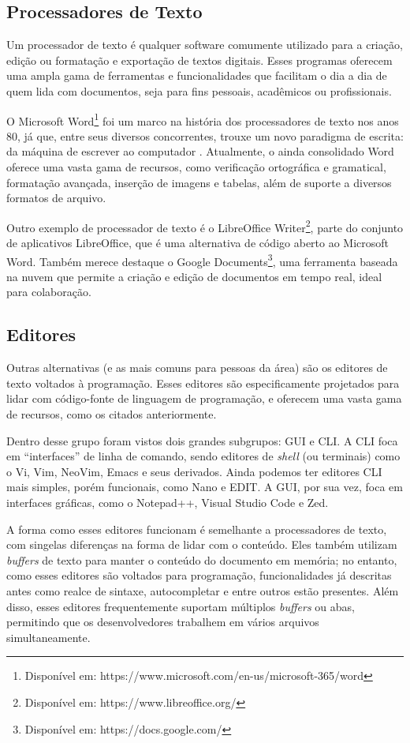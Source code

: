 \subsection{Processadores de Texto}

Um processador de texto é qualquer software comumente utilizado para a criação, edição ou formatação e exportação de textos digitais. Esses programas oferecem uma ampla gama de ferramentas e funcionalidades que facilitam o dia a dia de quem lida com documentos, seja para fins pessoais, acadêmicos ou profissionais.

O Microsoft Word\footnote{Disponível em: https://www.microsoft.com/en-us/microsoft-365/word} foi um marco na história dos processadores de texto nos anos 80, já que, entre seus diversos concorrentes, trouxe um novo paradigma de escrita: da máquina de escrever ao computador \cite{inbook}. Atualmente, o ainda consolidado Word oferece uma vasta gama de recursos, como verificação ortográfica e gramatical, formatação avançada, inserção de imagens e tabelas, além de suporte a diversos formatos de arquivo.

Outro exemplo de processador de texto é o LibreOffice Writer\footnote{Disponível em: https://www.libreoffice.org/}, parte do conjunto de aplicativos LibreOffice, que é uma alternativa de código aberto ao Microsoft Word. Também merece destaque o Google Documents\footnote{Disponível em: https://docs.google.com/}, uma ferramenta baseada na nuvem que permite a criação e edição de documentos em tempo real, ideal para colaboração.

\subsection{Editores}

Outras alternativas (e as mais comuns para pessoas da área) são os editores de texto voltados à programação. Esses editores são especificamente projetados para lidar com código-fonte de linguagem de programação, e oferecem uma vasta gama de recursos, como os citados anteriormente.

Dentro desse grupo foram vistos dois grandes subgrupos: GUI e CLI. A CLI foca em ``interfaces'' de linha de comando, sendo editores de \textit{shell} (ou terminais) como o Vi, Vim, NeoVim, Emacs e seus derivados. Ainda podemos ter editores CLI mais simples, porém funcionais, como Nano e EDIT. A GUI, por sua vez, foca em interfaces gráficas, como o Notepad++, Visual Studio Code e Zed.

A forma como esses editores funcionam é semelhante a processadores de texto, com singelas diferenças na forma de lidar com o conteúdo. Eles também utilizam \textit{buffers} de texto para manter o conteúdo do documento em memória; no entanto, como esses editores são voltados para programação, funcionalidades já descritas antes como realce de sintaxe, autocompletar e entre outros estão presentes. Além disso, esses editores frequentemente suportam múltiplos \textit{buffers} ou abas, permitindo que os desenvolvedores trabalhem em vários arquivos simultaneamente.

